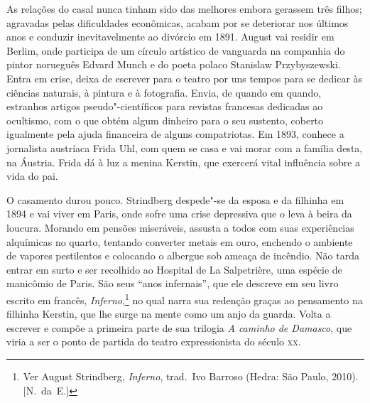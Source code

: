 As relações do casal nunca tinham sido das melhores embora gerassem três
filhos; agravadas pelas dificuldades econômicas, acabam por se
deteriorar nos últimos anos e conduzir inevitavelmente ao divórcio em
1891. August vai residir em Berlim, onde participa de um círculo
artístico de vanguarda na companhia do pintor norueguês Edvard Munch e
do poeta polaco Stanislaw Przybyszewski. Entra em crise, deixa de
escrever para o teatro por uns tempos para se dedicar às ciências
naturais, à pintura e à fotografia. Envia, de quando em quando,
estranhos artigos pseudo"-científicos para revistas francesas
dedicadas ao ocultismo, com o que obtém algum dinheiro para o seu
sustento, coberto igualmente pela ajuda financeira de alguns
compatriotas. Em 1893, conhece a jornalista austríaca Frida Uhl, com
quem se casa e vai morar com a família desta, na Áustria. Frida dá à
luz a menina Kerstin, que exercerá vital influência sobre a vida do pai. 

O casamento durou pouco. Strindberg despede"-se da esposa e da filhinha
em 1894 e vai viver em Paris, onde sofre uma crise depressiva que o
leva à beira da loucura. Morando em pensões miseráveis, assusta a todos
com suas experiências alquímicas no quarto, tentando converter metais
em ouro, enchendo o ambiente de vapores pestilentos e colocando o
albergue sob ameaça de incêndio. Não tarda entrar em surto e ser
recolhido ao Hospital de La Salpetrière, uma espécie de manicômio de
Paris. São seus ``anos infernais'', que ele descreve em seu livro escrito
em francês, \textit{Inferno},\footnote{ Ver August Strindberg, \textit{Inferno},
trad.~Ivo Barroso (Hedra: São Paulo, 2010). [N.~da~E.]} no qual narra
sua redenção graças ao pensamento na filhinha Kerstin, que lhe surge
na mente como um anjo da guarda. Volta a escrever e compõe a primeira
parte de sua trilogia \textit{A caminho de Damasco}, que viria a ser o
ponto de partida do teatro expressionista do século \textsc{xx}.

